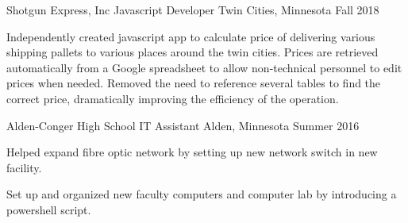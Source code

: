 \begin{cventries}
  \cventry
    {Shotgun Express, Inc}
    {Javascript Developer}
    {Twin Cities, Minnesota} %
    {Fall 2018} %
    {
      \begin{cvitems} %
        \item {Independently created javascript app to calculate price of delivering various shipping pallets to various places around the twin cities. Prices are retrieved automatically from a Google spreadsheet to allow non-technical personnel to edit prices when needed. Removed the need to reference several tables to find the correct price, dramatically improving the efficiency of the operation.}
      \end{cvitems}
    }

  \cventry
    {Alden-Conger High School} %
    {IT Assistant} %
    {Alden, Minnesota} %
    {Summer 2016} %
    {
      \begin{cvitems} %
        \item {Helped expand fibre optic network by setting up new network switch in new facility.}
        \item {Set up and organized new faculty computers and computer lab by introducing a powershell script.}
      \end{cvitems}
    }


\end{cventries}
